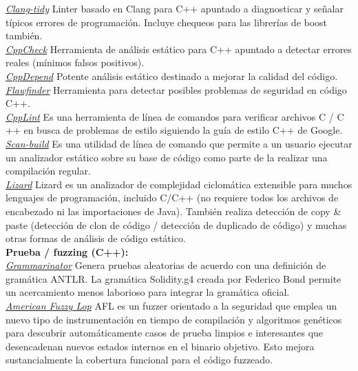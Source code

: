\underline{\textit{Clang-tidy}}\cite{ClangTidyLink}
Linter basado en Clang para C++ apuntado a diagnosticar y señalar típicos errores de programación. Incluye chequeos para las librerías de boost también.\\

\underline{\textit{CppCheck}}\cite{CppCheckLink}
Herramienta de análisis estático para C++ apuntado a detectar errores reales (mínimos falsos positivos).\\

\underline{\textit{CppDepend}}\cite{CppDependLink}
Potente análisis estático destinado a mejorar la calidad del código.\\

\underline{\textit{Flawfinder}}\cite{FlawfinderLink}
Herramienta para detectar posibles problemas de seguridad en código C++.\\

\underline{\textit{CppLint}}\cite{CppLintLink}
Es una herramienta de línea de comandos para verificar archivos C / C ++ en busca de problemas de estilo siguiendo la guía de estilo C++ de Google.\\

\underline{\textit{Scan-build}}\cite{ScanBuildLink}
Es una utilidad de línea de comando que permite a un usuario ejecutar un analizador estático sobre su base de código como parte de la realizar una compilación regular.\\

\underline{\textit{Lizard}}\cite{LizardLink}
Lizard es un analizador de complejidad ciclomática extensible para muchos lenguajes de programación, incluido C/C++ (no requiere todos los archivos de encabezado ni las importaciones de Java). También realiza detección de copy \& paste (detección de clon de código / detección de duplicado de código) y muchas otras formas de análisis de código estático.\\

\textbf{Prueba / fuzzing (C++):}\\

\underline{\textit{Grammarinator}}\cite{GrammarinatorLink}
Genera pruebas aleatorias de acuerdo con una definición de gramática ANTLR. La gramática Solidity.g4\cite{SolidityG4} creada por Federico Bond permite un acercamiento menos laborioso para integrar la gramática oficial.\\

\underline{\textit{American Fuzzy Lop}}\cite{AFLLink}
AFL es un fuzzer orientado a la seguridad que emplea un nuevo tipo de instrumentación en tiempo de compilación y algoritmos genéticos para descubrir automáticamente casos de prueba limpios e interesantes que desencadenan nuevos estados internos en el binario objetivo. Esto mejora sustancialmente la cobertura funcional para el código fuzzeado.\\

